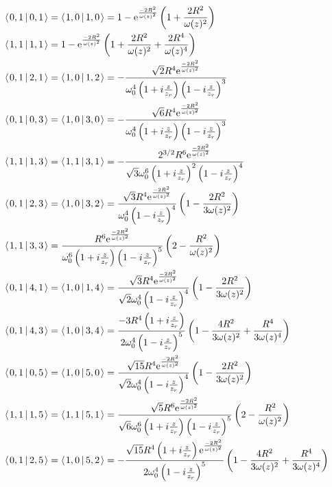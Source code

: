 \documentclass[11pt]{amsart}
\makeatletter
\newcommand{\e}{{\rm e}}				%
\newcommand{\msp}[1]{\mspace{#1mu}}		%
\newcommand{\0}{\varnothing}		%
\newcommand{\brac}[2]{\left\langle\msp{2} #1\left\lvert \msp{3.5} #2 \right.\right\rangle}	%
\newcommand{\1}{!}
\newcommand{\2}{@}
\newcommand{\3}{\#}
\newcommand{\4}{\$}
\newcommand{\5}{\%}
\newcommand{\6}{$^\wedge$}
\newcommand{\7}{\&}
\newcommand{\8}{*}
\newcommand{\9}{(}
\makeatother
\begin{document}
\begin{align*}
&\brac{0,1}{0,1} = \brac{1,0}{1,0} = 1-\e^{\frac{-2R^2}{\omega(z)^2}}\left(1+\frac{2R^2}{\omega(z)^2}\right)
\\
&\brac{1,1}{1,1} = 1-\e^{\frac{-2R^2}{\omega(z)^2}}\left(1+\frac{2R^2}{\omega(z)^2}+\frac{2R^4}{\omega(z)^4}\right)
\\
&
\brac{0,1}{2,1} = \brac{1,0}{1,2} = -\frac{\sqrt{2}R^4\e^{\frac{-2R^2}{\omega(z)^2}}}{\omega_0^4\left(1+i\frac{z}{z_r}\right)\left(1-i\frac{z}{z_r}\right)^3}
\\
&
\brac{0,1}{0,3} = \brac{1,0}{3,0} = -\frac{\sqrt{6}R^4\e^{\frac{-2R^2}{\omega(z)^2}}}{\omega_0^4\left(1+i\frac{z}{z_r}\right)\left(1-i\frac{z}{z_r}\right)^3}
\\
&
\brac{1,1}{1,3} = \brac{1,1}{3,1} = -\frac{2^{3/2}R^6\e^{\frac{-2R^2}{\omega(z)^2}}}{\sqrt{3}\omega_0^6\left(1+i\frac{z}{z_r}\right)^2\left(1-i\frac{z}{z_r}\right)^4}
\\
&
\brac{0,1}{2,3} = \brac{1,0}{3,2} = \frac{\sqrt{3}R^4\e^{\frac{-2R^2}{\omega(z)^2}}}{\omega_0^4\left(1-i\frac{z}{z_r}\right)^4}\left(1-\frac{2R^2}{3\omega(z)^2}\right)
\\
&
\brac{1,1}{3,3} = \frac{R^6\e^{\frac{-2R^2}{\omega(z)^2}}}{\omega_0^6\left(1+i\frac{z}{z_r}\right)\left(1-i\frac{z}{z_r}\right)^5}\left(2-\frac{R^2}{\omega(z)^2}\right)
\\
&
\brac{0,1}{4,1} = \brac{1,0}{1,4} = \frac{\sqrt{3}R^4\e^{\frac{-2R^2}{\omega(z)^2}}}{\sqrt{2}\omega_0^4\left(1-i\frac{z}{z_r}\right)^4}\left(1-\frac{2R^2}{3\omega(z)^2}\right)
\\
&
\brac{0,1}{4,3} = \brac{1,0}{3,4} = \frac{-3R^4\left(1+i\frac{z}{z_r}\right)}{2\omega_0^4\left(1-i\frac{z}{z_r}\right)^5}\left(1-\frac{4R^2}{3\omega(z)^2}+\frac{R^4}{3\omega(z)^4}\right)
\\
&
\brac{0,1}{0,5} = \brac{1,0}{5,0} = \frac{\sqrt{15}R^4\e^{\frac{-2R^2}{\omega(z)^2}}}{\sqrt{2}\omega_0^4\left(1-i\frac{z}{z_r}\right)^4}\left(1-\frac{2R^2}{3\omega(z)^2}\right)
\\
&
\brac{1,1}{1,5} = \brac{1,1}{5,1} = \frac{\sqrt{5}R^6\e^{\frac{-2R^2}{\omega(z)^2}}}{\sqrt{6}\omega_0^6\left(1+i\frac{z}{z_r}\right)\left(1-i\frac{z}{z_r}\right)^5}\left(2-\frac{R^2}{\omega(z)^2}\right)
\\
&
\brac{0,1}{2,5} = \brac{1,0}{5,2} = -\frac{\sqrt{15}R^4\left(1+i\frac{z}{z_r}\right)\e^{\frac{-2R^2}{\omega(z)^2}}}{2\omega_0^4\left(1-i\frac{z}{z_r}\right)^5}\left(1-\frac{4R^2}{3\omega(z)^2}+\frac{R^4}{3\omega(z)^4}\right)
\end{align*}
\end{document}
